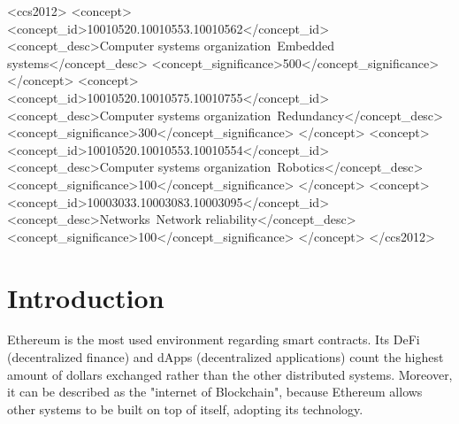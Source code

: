 \documentclass[a4paper,sigconf, language=french,
language=german, language=spanish, language=english]{acmart}
\begin{document}
\begin{CCSXML}
<ccs2012>
 <concept>
  <concept_id>10010520.10010553.10010562</concept_id>
  <concept_desc>Computer systems organization~Embedded systems</concept_desc>
  <concept_significance>500</concept_significance>
 </concept>
 <concept>
  <concept_id>10010520.10010575.10010755</concept_id>
  <concept_desc>Computer systems organization~Redundancy</concept_desc>
  <concept_significance>300</concept_significance>
 </concept>
 <concept>
  <concept_id>10010520.10010553.10010554</concept_id>
  <concept_desc>Computer systems organization~Robotics</concept_desc>
  <concept_significance>100</concept_significance>
 </concept>
 <concept>
  <concept_id>10003033.10003083.10003095</concept_id>
  <concept_desc>Networks~Network reliability</concept_desc>
  <concept_significance>100</concept_significance>
 </concept>
</ccs2012>
\end{CCSXML}






\maketitle

\section{Introduction}
Ethereum is the most used environment regarding smart contracts. Its DeFi (decentralized ﬁnance)
and dApps (decentralized applications) count the highest amount of dollars exchanged rather than the other distributed systems. Moreover, it can be described as the "internet of Blockchain", because Ethereum allows other systems to be built on top of itself, adopting its technology.
\end{document}
